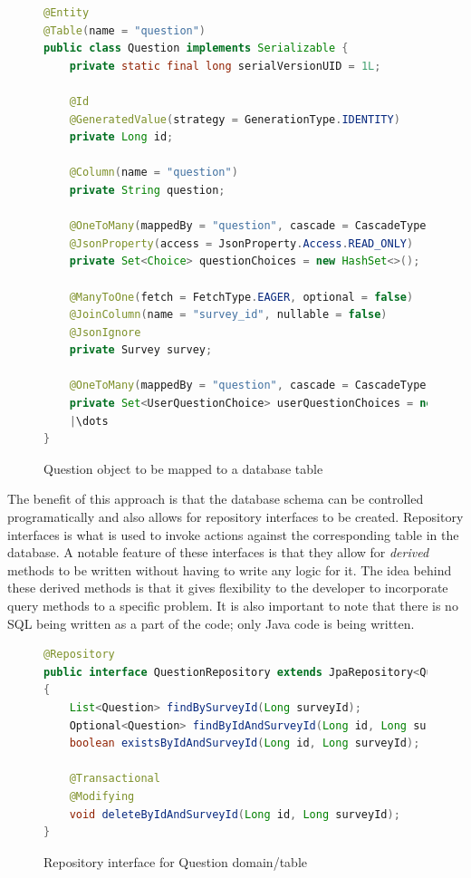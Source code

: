 \clearpage
\begin{figure}[ht]
    \centering
    \begin{lstlisting}[language=Java, escapechar=|]
@Entity
@Table(name = "question")
public class Question implements Serializable {
    private static final long serialVersionUID = 1L;

    @Id
    @GeneratedValue(strategy = GenerationType.IDENTITY)
    private Long id;

    @Column(name = "question")
    private String question;
    
    @OneToMany(mappedBy = "question", cascade = CascadeType.ALL)
    @JsonProperty(access = JsonProperty.Access.READ_ONLY)
    private Set<Choice> questionChoices = new HashSet<>();
    
    @ManyToOne(fetch = FetchType.EAGER, optional = false)
    @JoinColumn(name = "survey_id", nullable = false)
    @JsonIgnore
    private Survey survey;
    
    @OneToMany(mappedBy = "question", cascade = CascadeType.ALL)
    private Set<UserQuestionChoice> userQuestionChoices = new HashSet<>();
    |\dots
}    
    \end{lstlisting}
    \caption{Question object to be mapped to a database table}
    \label{question object}
\end{figure}


The benefit of this approach is that the database schema can be controlled programatically and also allows for repository interfaces to be created.
Repository interfaces is what is used to invoke actions against the corresponding table in the database.
A notable feature of these interfaces is that they allow for \textit{derived} methods to be written without having to write any logic for it.
The idea behind these derived methods is that it gives flexibility to the developer to incorporate query methods to a specific problem.
It is also important to note that there is no SQL being written as a part of the code; only Java code is being written.


\begin{figure}[ht]
    \centering
    \begin{lstlisting}[language=Java]
@Repository
public interface QuestionRepository extends JpaRepository<Question,Long> 
{
    List<Question> findBySurveyId(Long surveyId);
    Optional<Question> findByIdAndSurveyId(Long id, Long surveyId);
    boolean existsByIdAndSurveyId(Long id, Long surveyId);

    @Transactional
    @Modifying
    void deleteByIdAndSurveyId(Long id, Long surveyId);
}
    \end{lstlisting}
    \caption{Repository interface for Question domain/table}
    \label{repo example}
\end{figure}


